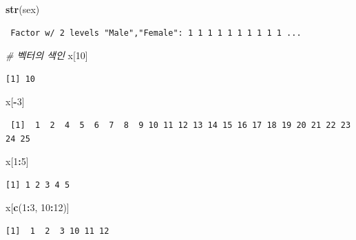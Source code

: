 \documentclass[11pt,a4paper]{book}
\newenvironment{Shaded}{\begin{snugshade}}{\end{snugshade}}
\newcommand{\KeywordTok}[1]{\textcolor[rgb]{0.13,0.29,0.53}{\textbf{#1}}}
\newcommand{\DecValTok}[1]{\textcolor[rgb]{0.00,0.00,0.81}{#1}}
\newcommand{\CommentTok}[1]{\textcolor[rgb]{0.56,0.35,0.01}{\textit{#1}}}
\newcommand{\OperatorTok}[1]{\textcolor[rgb]{0.81,0.36,0.00}{\textbf{#1}}}
\newcommand{\NormalTok}[1]{#1}
\theoremstyle{definition}
\theoremstyle{definition}
\theoremstyle{definition}
\theoremstyle{remark}
\begin{document}
\begin{Shaded}
\begin{Highlighting}[]
\KeywordTok{str}\NormalTok{(sex)}
\end{Highlighting}
\end{Shaded}

\begin{verbatim}
 Factor w/ 2 levels "Male","Female": 1 1 1 1 1 1 1 1 1 1 ...
\end{verbatim}

\begin{Shaded}
\begin{Highlighting}[]
\CommentTok{# 벡터의 색인}
\NormalTok{x[}\DecValTok{10}\NormalTok{]}
\end{Highlighting}
\end{Shaded}

\begin{verbatim}
[1] 10
\end{verbatim}

\begin{Shaded}
\begin{Highlighting}[]
\NormalTok{x[}\OperatorTok{-}\DecValTok{3}\NormalTok{]}
\end{Highlighting}
\end{Shaded}

\begin{verbatim}
 [1]  1  2  4  5  6  7  8  9 10 11 12 13 14 15 16 17 18 19 20 21 22 23 24 25
\end{verbatim}

\begin{Shaded}
\begin{Highlighting}[]
\NormalTok{x[}\DecValTok{1}\OperatorTok{:}\DecValTok{5}\NormalTok{]}
\end{Highlighting}
\end{Shaded}

\begin{verbatim}
[1] 1 2 3 4 5
\end{verbatim}

\begin{Shaded}
\begin{Highlighting}[]
\NormalTok{x[}\KeywordTok{c}\NormalTok{(}\DecValTok{1}\OperatorTok{:}\DecValTok{3}\NormalTok{, }\DecValTok{10}\OperatorTok{:}\DecValTok{12}\NormalTok{)]}
\end{Highlighting}
\end{Shaded}

\begin{verbatim}
[1]  1  2  3 10 11 12
\end{verbatim}
\end{document}

